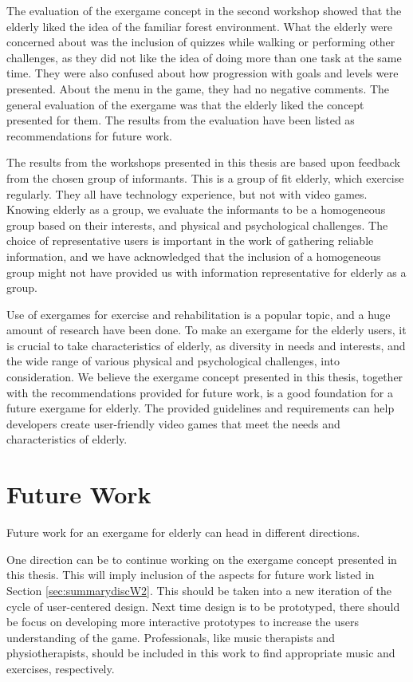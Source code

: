 The evaluation of the exergame concept in the second workshop showed that the elderly liked the idea of the familiar forest environment. What the elderly were concerned about was the inclusion of quizzes while walking or performing other challenges, as they did not like the idea of doing more than one task at the same time. They were also confused about how progression with goals and levels were presented. About the menu in the game, they had no negative comments. The general evaluation of the exergame was that the elderly liked the concept presented for them. The results from the evaluation have been listed as recommendations for future work. 

The results from the workshops presented in this thesis are based upon feedback from the chosen group of informants. This is a group of fit elderly, which exercise regularly. They all have technology experience, but not with video games. Knowing elderly as a group, we evaluate the informants to be a homogeneous group based on their interests, and physical and psychological challenges. The choice of representative users is important in the work of gathering reliable information, and we have acknowledged that the inclusion of a homogeneous group might not have provided us with information representative for elderly as a group. 

Use of exergames for exercise and rehabilitation is a popular topic, and a huge amount of research have been done. To make an exergame for the elderly users, it is crucial to take characteristics of elderly, as diversity in needs and interests, and the wide range of various physical and psychological challenges, into consideration. We believe the exergame concept presented in this thesis, together with the recommendations provided for future work, is a good foundation for a future exergame for elderly. The provided guidelines and requirements can help developers create user-friendly video games that meet the needs and characteristics of elderly.
 

\section{Future Work}

Future work for an exergame for elderly can head in different directions. 

One direction can be to continue working on the exergame concept presented in this thesis. This will imply inclusion of the aspects for future work listed in Section \ref{sec:summarydiscW2}. This should be taken into a new iteration of the cycle of user-centered design. Next time design is to be prototyped, there should be focus on developing more interactive prototypes to increase the users understanding of the game. Professionals, like music therapists and physiotherapists, should be included in this work to find appropriate music and exercises, respectively.

